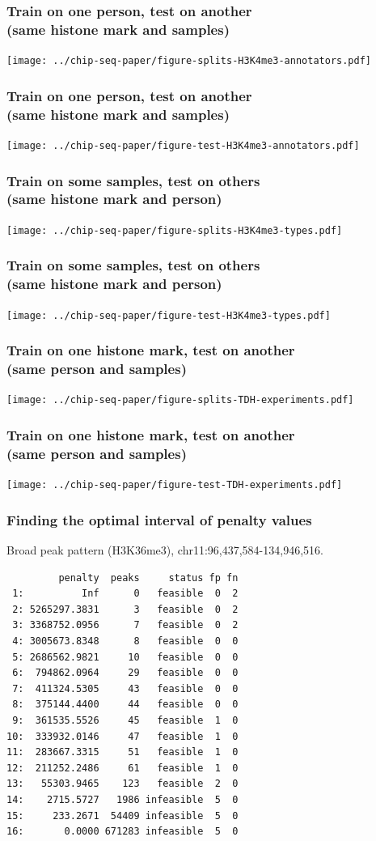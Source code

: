\documentclass{beamer}
\begin{document}
\begin{frame}
  \frametitle{Train on one person, test on another\\
(same histone mark and samples)}
  \texttt{[image: ../chip-seq-paper/figure-splits-H3K4me3-annotators.pdf]}
\end{frame}

\begin{frame}
  \frametitle{Train on one person, test on another\\
(same histone mark and samples)}
  \texttt{[image: ../chip-seq-paper/figure-test-H3K4me3-annotators.pdf]}
\end{frame}

\begin{frame}
  \frametitle{Train on some samples, test on others\\
(same histone mark and person)}
  \texttt{[image: ../chip-seq-paper/figure-splits-H3K4me3-types.pdf]}
\end{frame}

\begin{frame}
  \frametitle{Train on some samples, test on others\\
(same histone mark and person)}
  \texttt{[image: ../chip-seq-paper/figure-test-H3K4me3-types.pdf]}
\end{frame}

\begin{frame}
  \frametitle{Train on one histone mark, test on another\\
(same person and samples)}
  \texttt{[image: ../chip-seq-paper/figure-splits-TDH-experiments.pdf]}
\end{frame}

\begin{frame}
  \frametitle{Train on one histone mark, test on another\\
(same person and samples)}
  \texttt{[image: ../chip-seq-paper/figure-test-TDH-experiments.pdf]}
\end{frame}

\begin{frame}[fragile]
  \frametitle{Finding the optimal interval of penalty values}
\vskip 0.2cm Broad peak pattern (H3K36me3), chr11:96,437,584-134,946,516.
\scriptsize
\begin{verbatim}
         penalty  peaks     status fp fn
 1:          Inf      0   feasible  0  2
 2: 5265297.3831      3   feasible  0  2
 3: 3368752.0956      7   feasible  0  2
 4: 3005673.8348      8   feasible  0  0
 5: 2686562.9821     10   feasible  0  0
 6:  794862.0964     29   feasible  0  0
 7:  411324.5305     43   feasible  0  0
 8:  375144.4400     44   feasible  0  0
 9:  361535.5526     45   feasible  1  0
10:  333932.0146     47   feasible  1  0
11:  283667.3315     51   feasible  1  0
12:  211252.2486     61   feasible  1  0
13:   55303.9465    123   feasible  2  0
14:    2715.5727   1986 infeasible  5  0
15:     233.2671  54409 infeasible  5  0
16:       0.0000 671283 infeasible  5  0
\end{verbatim}
\end{frame}
\end{document}
